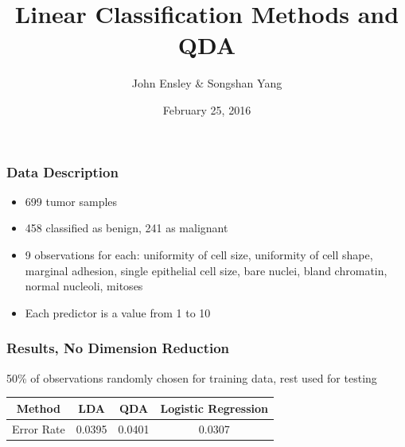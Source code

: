 \documentclass[10pt]{beamer}
\title{Linear Classification Methods and QDA}
\date{February 25, 2016}
\author{John Ensley \& Songshan Yang}
\institute{Penn State University \\ STAT 557}
\begin{document}

\maketitle



\begin{frame}\frametitle{Data Description}
\begin{itemize}
  \item 699 tumor samples
  \item 458 classified as benign, 241 as malignant
  \item 9 observations for each: uniformity of cell size, uniformity of cell shape, marginal adhesion, single epithelial cell size, bare nuclei, bland chromatin, normal nucleoli, mitoses
  \item Each predictor is a value from 1 to 10
\end{itemize}
\end{frame}

\begin{frame}\frametitle{Results, No Dimension Reduction}

50\% of observations randomly chosen for training data, rest used for testing
  \begin{center}
  \begin{tabular}{cccc}
    \toprule
    Method & LDA & QDA & Logistic Regression \\
    \midrule
    Error Rate & 0.0395 & 0.0401 & 0.0307 \\
    \bottomrule
  \end{tabular}
  \end{center}

\end{frame}
\end{document}

